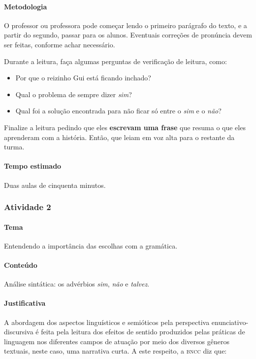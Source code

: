 \documentclass[11pt]{extarticle}
\begin{document}
\paragraph{Metodologia} O professor ou professora pode começar lendo o primeiro parágrafo do texto,
e a partir do segundo, passar para os alunos. Eventuais correções de pronúncia devem
ser feitas, conforme achar necessário. 

Durante a leitura, faça algumas perguntas de verificação de leitura, como:

\begin{itemize}
\item Por que o reizinho Gui está ficando inchado?
\item Qual o problema de sempre dizer \textit{sim}?
\item Qual foi a solução encontrada para não ficar só entre o \textit{sim} e o \textit{não}?
\end{itemize}

Finalize a leitura pedindo que eles \textbf{escrevam uma frase} que resuma o que 
eles aprenderam com a história. Então, que leiam em voz alta para o restante da turma. 

\paragraph{Tempo estimado} Duas aulas de cinquenta minutos.

\subsubsection{Atividade 2}


\paragraph{Tema} Entendendo a importância das escolhas com a gramática.

\paragraph{Conteúdo} Análise sintática: os advérbios \textit{sim}, \textit{não} e \textit{talvez}.

\paragraph{Justificativa} A abordagem dos aspectos linguísticos e semióticos 
pela perspectiva enunciativo-discursiva é feita pela leitura dos efeitos de 
sentido produzidos pelas práticas de linguagem nos diferentes campos de atuação 
por meio dos diversos gêneros textuais, neste caso, uma narrativa curta.
A este respeito, a \textsc{bncc} diz que:
\end{document}
